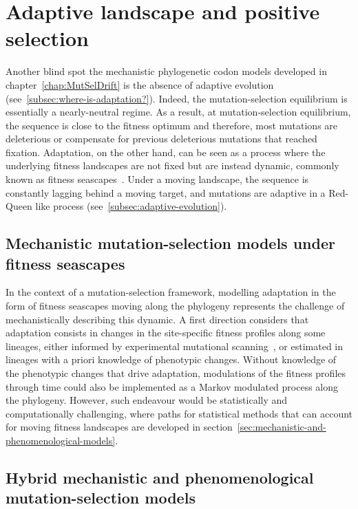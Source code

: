 \section{Adaptive landscape and positive selection}
\label{sec:adaptative-landscape}

Another blind spot the mechanistic phylogenetic codon models developed in chapter~\ref{chap:MutSelDrift} is the absence of adaptive evolution (see~\ref{subsec:where-is-adaptation?}).
Indeed, the mutation-selection equilibrium is essentially a nearly-neutral regime.
As a result, at mutation-selection equilibrium, the sequence is close to the fitness optimum and therefore, most mutations are deleterious or compensate for previous deleterious mutations that reached fixation.
Adaptation, on the other hand, can be seen as a process where the underlying fitness landscapes are not fixed but are instead dynamic, commonly known as fitness seascapes~\citep{Mustonen2009}.
Under a moving landscape, the sequence is constantly lagging behind a moving target, and mutations are adaptive in a Red-Queen like process (see~\ref{subsec:adaptive-evolution}).

\subsection{Mechanistic mutation-selection models under fitness seascapes}
\label{subsec:mechanistic-fluctuating-selection}

In the context of a mutation-selection framework, modelling adaptation in the form of fitness seascapes moving along the phylogeny represents the challenge of mechanistically describing this dynamic.
A first direction considers that adaptation consists in changes in the site-specific fitness profiles along some lineages, either informed by experimental mutational scanning~\citep{Bloom2017}, or estimated in lineages with a priori knowledge of phenotypic changes\citep{Tamuri2009, Parto2018, Parto2018a}.
Without knowledge of the phenotypic changes that drive adaptation, modulations of the fitness profiles through time could also be implemented as a Markov modulated process along the phylogeny.
However, such endeavour would be statistically and computationally challenging, where paths for statistical methods that can account for moving fitness landscapes are developed in section~\ref{sec:mechanistic-and-phenomenological-models}.

\subsection{Hybrid mechanistic and phenomenological mutation-selection models}
\label{subsec:hybrid-mechanistic-and-phenomenological-mutation-selection-models}

